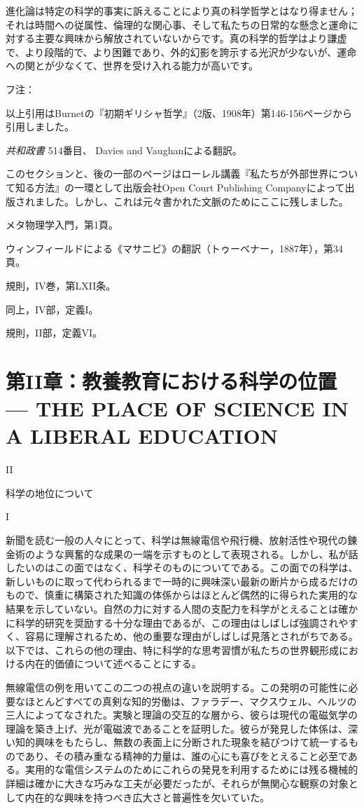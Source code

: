\documentclass[a4paper,11pt,openany]{ltjsbook}
\begin{document}
進化論は特定の科学的事実に訴えることにより真の科学哲学とはなり得ません；それは時間への従属性、倫理的な関心事、そして私たちの日常的な懸念と運命に対する主要な興味から解放されていないからです。真の科学的哲学はより謙虚で、より段階的で、より困難であり、外的幻影を誇示する光沢が少ないが、運命への関とが少なくて、世界を受け入れる能力が高いです。

フ注：

 以上引用はBurnetの『初期ギリシャ哲学』（2版、1908年）第146-156ページから引用しました。

 \textit{共和政書} 514番目、 Davies and Vaughanによる翻訳。

 このセクションと、後の一部のページはローレル講義『私たちが外部世界について知る方法』の一環として出版会社Open Court Publishing Companyによって出版されました。しかし、これは元々書かれた文脈のためにここに残しました。


 メタ物理学入門，第1頁。

 ウィンフィールドによる《マサニビ》の翻訳（トゥーベナー，1887年），第34頁。

 規則，IV巻，第LXII条。

 同上，IV部，定義I。

 規則，II部，定義VI。


\chapter{第II章：教養教育における科学の位置 --- {THE PLACE OF SCIENCE IN A LIBERAL EDUCATION}}

II

科学の地位について


I

新聞を読む一般の人々にとって、科学は無線電信や飛行機、放射活性や現代の錬金術のような興奮的な成果の一端を示すものとして表現される。しかし、私が話したいのはこの面ではなく、科学そのものについてである。この面での科学は、新しいものに取って代わられるまで一時的に興味深い最新の断片から成るだけのもので、慎重に構築された知識の体係からはほとんど偶然的に得られた実用的な結果を示していない。自然の力に対する人間の支配力を科学がとえることは確かに科学的研究を奨励する十分な理由であるが、この理由はしばしば強調されやすく、容易に理解されるため、他の重要な理由がしばしば見落とされがちである。以下では、これらの他の理由、特に科学的な思考習慣が私たちの世界観形成における内在的価値について述べることにする。

無線電信の例を用いてこの二つの視点の違いを説明する。この発明の可能性に必要なほとんどすべての真剣な知的労働は、ファラデー、マクスウェル、ヘルツの三人によってなされた。実験と理論の交互的な層から、彼らは現代の電磁気学の理論を築き上げ、光が電磁波であることを証明した。彼らが発見した体係は、深い知的興味をもたらし、無数の表面上に分断された現象を結びつけて統一するものであり、その積み重なる精神的力量は、誰の心にも喜びをとえること必至である。実用的な電信システムのためにこれらの発見を利用するためには残る機械的詳細は確かに大きな巧みな工夫が必要だったが、それらが無関心な観察の対象として内在的な興味を持つべき広大さと普遍性を欠いていた。
\end{document}
